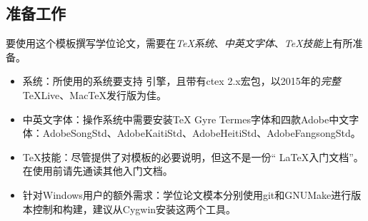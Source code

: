 \subsection{准备工作}
\label{sec:requirements}

要使用这个模板撰写学位论文，需要在\emph{TeX系统}、\emph{中英文字体}、\emph{TeX技能}上有所准备。

\begin{itemize}[noitemsep,topsep=0pt,parsep=0pt,partopsep=0pt]
	\item 系统：所使用的系统要支持 引擎，且带有ctex 2.x宏包，以2015年的\emph{完整}TeXLive、MacTeX发行版为佳。
	\item 中英文字体：操作系统中需要安装TeX Gyre Termes字体和四款Adobe中文字体：AdobeSongStd、AdobeKaitiStd、AdobeHeitiStd、AdobeFangsongStd。
	\item TeX技能：尽管提供了对模板的必要说明，但这不是一份“ \LaTeX 入门文档”。在使用前请先通读其他入门文档。
	\item 针对Windows用户的额外需求：学位论文模本分别使用git和GNUMake进行版本控制和构建，建议从Cygwin安装这两个工具。
\end{itemize}